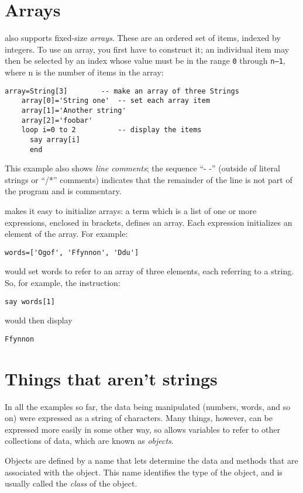 \section{Arrays}
\nr{} also supports fixed-size \emph{arrays}. These are an ordered set of
items, indexed by integers. To use an array, you first have to
construct it; an individual item may then be selected by an index
whose value must be in the range \texttt{0} through \texttt{n–1}, where n is the number
of items in the array:
\begin{lstlisting}[label=arrays,caption=Arrays]
    array=String[3]        -- make an array of three Strings
    array[0]='String one'  -- set each array item
    array[1]='Another string'
    array[2]='foobar'
    loop i=0 to 2          -- display the items
      say array[i]
      end
\end{lstlisting}
This example also shows \nr{} \emph{line comments}; the sequence “- -” (outside of literal strings or “/*” comments)
indicates that the remainder of the line is not part of the program and is commentary.

\nr{} makes it easy to initialize arrays: a term which is a list of
one or more expressions, enclosed in brackets, defines an array. Each
expression initializes an element of the array. For example:
\begin{lstlisting}[label=initializingelements,caption=Initializing elements]
words=['Ogof', 'Ffynnon', 'Ddu']
\end{lstlisting}
would set words to refer to an array of three elements, each referring to a string. So, for
example, the instruction:
\begin{lstlisting}[label=addresselement,caption=Address Array Element]
say words[1]
\end{lstlisting}
would then display 
\begin{lstlisting}
Ffynnon
\end{lstlisting}

\section{Things that aren’t strings}
In all the examples so far, the data being manipulated (numbers, words, and so on) were expressed as a string of characters. Many things, however, can be expressed more easily in some other way, so \nr{} allows variables to refer to other collections of data, which are known as \emph{objects}.

Objects are defined by a name that lets \nr{} determine the data and methods that are associated with the object. This name identifies the type of the object, and is usually called the \emph{class} of the object.

